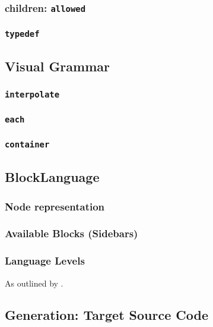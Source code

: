 \subsubsection{children: \texttt{allowed}}

\subsubsection{\texttt{typedef}}

\subsection{Visual Grammar}

\subsubsection{\texttt{interpolate}}

\subsubsection{\texttt{each}}

\subsubsection{\texttt{container}}

\subsection{BlockLanguage}

\subsubsection{Node representation}

\subsubsection{Available Blocks (Sidebars)}

\subsubsection{Language Levels}

As outlined by \cite{klaeren_macht_2007}.

\subsection{Generation: Target Source Code}

